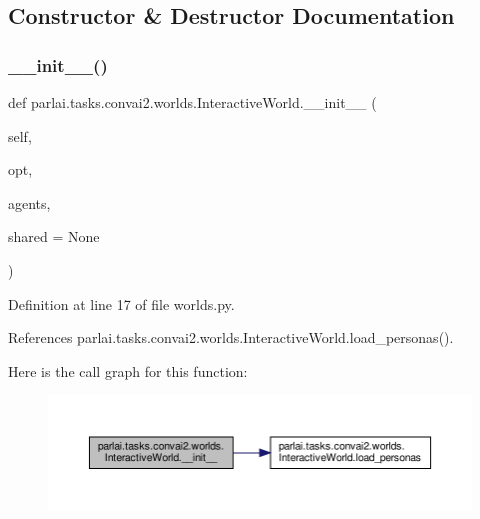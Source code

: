 \subsection{Constructor \& Destructor Documentation}
\mbox{\label{classparlai_1_1tasks_1_1convai2_1_1worlds_1_1InteractiveWorld_a5fb521abcaeae7438ab08feff1bdfccf}} 
\subsubsection{\texorpdfstring{\+\_\+\+\_\+init\+\_\+\+\_\+()}{\_\_init\_\_()}}
{\footnotesize\ttfamily def parlai.\+tasks.\+convai2.\+worlds.\+Interactive\+World.\+\_\+\+\_\+init\+\_\+\+\_\+ (\begin{DoxyParamCaption}\item[{}]{self,  }\item[{}]{opt,  }\item[{}]{agents,  }\item[{}]{shared = {\ttfamily None} }\end{DoxyParamCaption})}



Definition at line 17 of file worlds.\+py.



References parlai.\+tasks.\+convai2.\+worlds.\+Interactive\+World.\+load\+\_\+personas().

Here is the call graph for this function\+:
\nopagebreak
\begin{figure}[H]
\begin{center}
\leavevmode
\includegraphics[width=350pt]{classparlai_1_1tasks_1_1convai2_1_1worlds_1_1InteractiveWorld_a5fb521abcaeae7438ab08feff1bdfccf_cgraph}
\end{center}
\end{figure}


